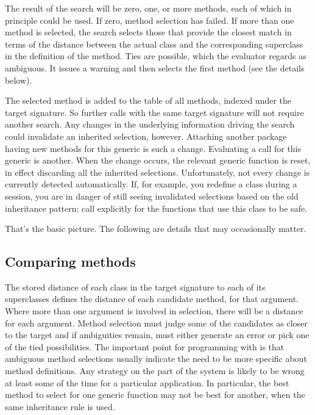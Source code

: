 \documentclass[11pt]{article}
\begin{document}
The result of the search will be zero, one, or more methods, each of which in principle could be used.
If zero, method selection has failed.
If more than  one method is selected, the search selects those that provide the closest match in terms of the distance between the actual class and the corresponding superclass in the definition of the method.
Ties are possible, which the evaluator regards as ambiguous.
It issues a warning and then selects the first method (see the details below).

The selected method is added to the table of all methods, indexed under the target signature.
So further calls with the same target signature will not require another search.
Any changes in the underlying information driving the search could invalidate an inherited selection, however.
Attaching another package  having new methods for this generic is such a change.
Evaluating a  call for this generic is another.
When the change occurs,  the relevant generic function is reset, in effect discarding all the inherited selections.
Unfortunately,
not every change is currently detected automatically.
If, for example, you redefine a class during a session, you are in danger of still seeing invalidated selections based on the old inheritance pattern:  call  explicitly for the functions that use this class to be safe.

That's the basic picture.  The following are details that may occasionally matter.

\subsection*{Comparing methods}

The stored distance of each class in the target signature to each of its superclasses defines the distance of each candidate method, for that argument.
Where more than one argument is involved in selection, there will be a distance for each argument.
Method selection must judge some of the candidates as closer to the target and if ambiguities remain, must either generate an error or pick one of the tied possibilities.
The important point for programming with \R{} is that ambiguous method selections usually indicate the need to be more specific about method definitions.
Any strategy on the part of the system is likely to be wrong at least some of the time for a particular application.
In particular, the best method to select for one generic function may not be best for another, when the same inheritance rule is used.
\end{document}
